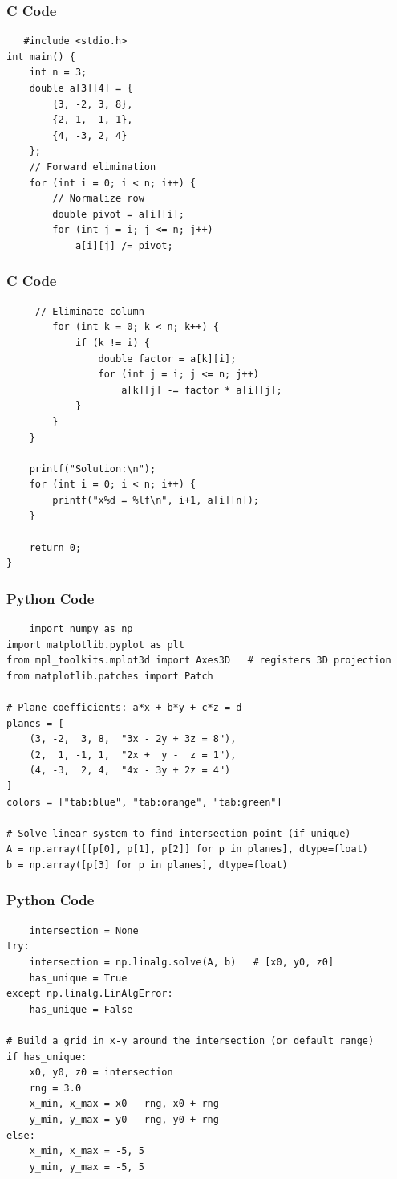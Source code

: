 \documentclass{beamer}
\begin{document}
\begin{frame}[fragile]
\frametitle{C Code}
\begin{lstlisting}
   #include <stdio.h>
int main() {
    int n = 3;
    double a[3][4] = {
        {3, -2, 3, 8},
        {2, 1, -1, 1},
        {4, -3, 2, 4}
    };
    // Forward elimination
    for (int i = 0; i < n; i++) {
        // Normalize row
        double pivot = a[i][i];
        for (int j = i; j <= n; j++)
            a[i][j] /= pivot; 
\end{lstlisting}
\end{frame}
\begin{frame}[fragile]
\frametitle{C Code}
\begin{lstlisting}
     // Eliminate column
        for (int k = 0; k < n; k++) {
            if (k != i) {
                double factor = a[k][i];
                for (int j = i; j <= n; j++)
                    a[k][j] -= factor * a[i][j];
            }
        }
    }

    printf("Solution:\n");
    for (int i = 0; i < n; i++) {
        printf("x%d = %lf\n", i+1, a[i][n]);
    }

    return 0;
}
\end{lstlisting}
\end{frame}
\begin{frame}[fragile]
\frametitle{Python Code}
\begin{lstlisting}
    import numpy as np
import matplotlib.pyplot as plt
from mpl_toolkits.mplot3d import Axes3D   # registers 3D projection
from matplotlib.patches import Patch

# Plane coefficients: a*x + b*y + c*z = d
planes = [
    (3, -2,  3, 8,  "3x - 2y + 3z = 8"),
    (2,  1, -1, 1,  "2x +  y -  z = 1"),
    (4, -3,  2, 4,  "4x - 3y + 2z = 4")
]
colors = ["tab:blue", "tab:orange", "tab:green"]

# Solve linear system to find intersection point (if unique)
A = np.array([[p[0], p[1], p[2]] for p in planes], dtype=float)
b = np.array([p[3] for p in planes], dtype=float)
\end{lstlisting}
\end{frame}
\begin{frame}[fragile]
\frametitle{Python Code}
\begin{lstlisting}
    intersection = None
try:
    intersection = np.linalg.solve(A, b)   # [x0, y0, z0]
    has_unique = True
except np.linalg.LinAlgError:
    has_unique = False

# Build a grid in x-y around the intersection (or default range)
if has_unique:
    x0, y0, z0 = intersection
    rng = 3.0
    x_min, x_max = x0 - rng, x0 + rng
    y_min, y_max = y0 - rng, y0 + rng
else:
    x_min, x_max = -5, 5
    y_min, y_max = -5, 5
\end{lstlisting}
\end{frame}
\end{document}
